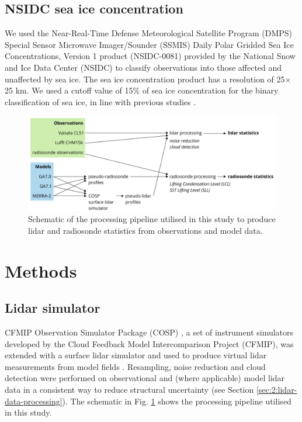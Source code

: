 \subsection{NSIDC sea ice concentration}

We used the Near-Real-Time Defense Meteorological Satellite Program (DMPS)
Special Sensor Microwave Imager/Sounder (SSMIS) Daily Polar Gridded Sea Ice
Concentrations, Version 1 product (NSIDC-0081) \citep{maslanik1999} provided by
the National Snow and Ice Data Center (NSIDC) to classify observations into
those affected and unaffected by sea ice. The sea ice concentration product has
a resolution of 25$\times$25 \unit{km}. We used a cutoff value of 15\% of sea
ice concentration for the binary classification of sea ice, in line with
previous studies \citep{comiso2008}.

\begin{figure}[t]
\centering
\includegraphics[width=\textwidth]{chapter2/fig/schematic.pdf}
\caption[Schematic of the processing pipeline]{
Schematic of the processing pipeline utilised in this study to produce lidar and
radiosonde statistics from observations and model data.
}
\label{fig:2:schematic}
\end{figure}

\section{Methods}

\subsection{Lidar simulator}

CFMIP Observation Simulator Package (COSP) \citep{bodas-salcedo2011}, a set of
instrument simulators developed by the Cloud Feedback Model Intercomparison
Project (CFMIP), was extended with a surface lidar simulator and used to produce
virtual lidar measurements from model fields \citep{kuma2020b}. Resampling, noise
reduction and cloud detection were performed on observational and (where
applicable) model lidar data in a consistent way to reduce structural
uncertainty (see Section \ref{sec:2:lidar-data-processing}). The schematic in
Fig. \ref{fig:2:schematic} shows the processing pipeline utilised in this study.

